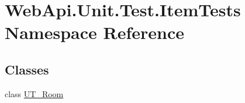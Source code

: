 \hypertarget{namespace_web_api_1_1_unit_1_1_test_1_1_item_tests}{}\section{Web\+Api.\+Unit.\+Test.\+Item\+Tests Namespace Reference}
\label{namespace_web_api_1_1_unit_1_1_test_1_1_item_tests}
\subsection*{Classes}
\begin{DoxyCompactItemize}
\item 
class \mbox{\hyperlink{class_web_api_1_1_unit_1_1_test_1_1_item_tests_1_1_u_t___room}{U\+T\+\_\+\+Room}}
\end{DoxyCompactItemize}

